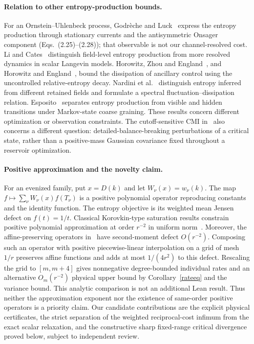 \documentclass[11pt]{article}
\begin{document}
\paragraph{Relation to other entropy-production bounds.}
For an Ornstein--Uhlenbeck process, Godr\`eche and Luck~\cite{godreche} express the entropy production through stationary currents and the antisymmetric Onsager component (Eqs.~(2.25)--(2.28)); that observable is not our channel-resolved cost. Li and Cates~\cite{licates} distinguish field-level entropy production from more resolved dynamics in scalar Langevin models. Horowitz, Zhou and England~\cite[Eq.~(13)]{horowitzzhou}, and Horowitz and England~\cite[Eqs.~(11)--(14)]{horowitz}, bound the dissipation of ancillary control using the uncontrolled relative-entropy decay. Nardini et al.~\cite[Eq.~(30) and Sec.~V]{nardini} distinguish entropy inferred from different retained fields and formulate a spectral fluctuation--dissipation relation. Esposito~\cite[Eqs.~(71)--(77)]{esposito} separates entropy production from visible and hidden transitions under Markov-state coarse graining. These results concern different optimization or observation constraints. The cutoff-sensitive CMI in~\cite{chen} also concerns a different question: detailed-balance-breaking perturbations of a critical state, rather than a positive-mass Gaussian covariance fixed throughout a reservoir optimization.

\paragraph{Positive approximation and the novelty claim.}
For an evenized family, put $x=D(k)$ and let $W_\nu(x)=w_\nu(k)$. The map $f\mapsto \sum_\nu W_\nu(x) f(T_\nu)$ is a positive polynomial operator reproducing constants and the identity function. The entropy objective is its weighted mean Jensen defect on $f(t)=1/t$. Classical Korovkin-type saturation results constrain positive polynomial approximation at order $r^{-2}$ in uniform norm~\cite[Sec.~3]{pinkus}. Moreover, the affine-preserving operators in~\cite[Lemmas~2.12--2.13 and Sec.~2.5]{kopotun} have second-moment defect $O(r^{-2})$. Composing such an operator with positive piecewise-linear interpolation on a grid of mesh $1/r$ preserves affine functions and adds at most $1/(4r^2)$ to this defect. Rescaling the grid to $[m,m+4]$ gives nonnegative degree-bounded individual rates and an alternative $O_m(r^{-2})$ physical upper bound by Corollary~\ref{rateeq} and the variance bound. This analytic comparison is not an additional Lean result. Thus neither the approximation exponent nor the existence of same-order positive operators is a priority claim. Our candidate contributions are the explicit physical certificates, the strict separation of the weighted reciprocal-cost infimum from the exact scalar relaxation, and the constructive sharp fixed-range critical divergence proved below, subject to independent review.
\end{document}
